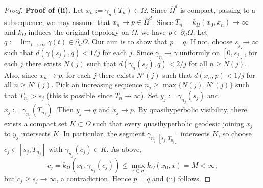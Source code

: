 \documentclass[10pt,a4paper]{amsart}
\begin{document}
\begin{proof}
	\noindent\textbf{Proof of (ii).}
	Let $x_n:=\gamma_n(T_n)\in\Omega$. Since $\overline{\Omega}^d$ is compact, passing to a subsequence, we may assume that $x_n\to p\in\overline{\Omega}^d$.
	Since $T_n=k_\Omega(x_0,x_n)\to\infty$ and $k_\Omega$ induces the original topology on $\Omega$, we have $p\in\partial_d\Omega$.
	Let $q:=\lim_{t\to\infty}\gamma(t)\in\partial_d\Omega$. Our aim is to show that $p=q$. If not, choose $s_j\to\infty$ such that $d(\gamma(s_j),q)<1/j$ for each $j$.
		Since $\gamma_n\to\gamma$ uniformly on $[0,s_j]$, for each $j$ there exists $N(j)$ such that
		$d(\gamma_n(s_j),q)<2/j$ for all $n\ge N(j)$.
		Also, since $x_n\to p$, for each $j$ there exists $N'(j)$ such that $d(x_n,p)<1/j$ for all $n\ge N'(j)$. Pick an increasing sequence $n_j\ge \max\{N(j),N'(j)\}$ such that $T_{n_j}>s_j$ (this is possible since $T_n\to \infty$). Set $y_j:=\gamma_{n_j}(s_j)$ and $x_j:=\gamma_{n_j}(T_{n_j})$. Then $y_j\to q$ and $x_j\to p$. By quasihyperbolic visibility, there exists a compact set $K\subset\Omega$ such that every quasihyperbolic geodesic joining $x_j$ to $y_j$ intersects $K$.
	In particular, the segment $\gamma_{n_j}|_{[s_j,T_{n_j}]}$ intersects $K$, so choose
	$c_j\in[s_j,T_{n_j}]$ with $\gamma_{n_j}(c_j)\in K$. As above,
	\[
	c_j=k_\Omega(x_0,\gamma_{n_j}(c_j))\le \max_{x\in K}k_\Omega(x_0,x)=M<\infty,
	\]
	but $c_j\ge s_j\to\infty$, a contradiction. Hence $p=q$ and (ii) follows.
\end{proof}
\end{document}
